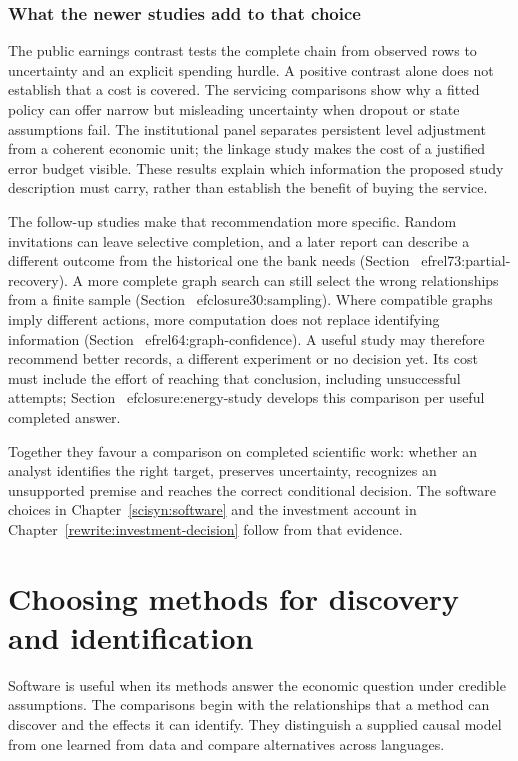 \section{What the newer studies add to that choice}
The public earnings contrast tests the complete chain from observed rows to
uncertainty and an explicit spending hurdle. A positive contrast alone does
not establish that a cost is covered. The servicing comparisons show why a
fitted policy can offer narrow but misleading uncertainty when dropout or
state assumptions fail. The institutional panel separates persistent level
adjustment from a coherent economic unit; the linkage study makes the cost
of a justified error budget visible. These results explain which information
the proposed study description must carry, rather than establish the benefit
of buying the service.

The follow-up studies make that recommendation more specific. Random
invitations can leave selective completion, and a later report can describe
a different outcome from the historical one the bank needs
(Section~
ef{rel73:partial-recovery}). A more complete graph search can
still select the wrong relationships from a finite sample
(Section~
ef{closure30:sampling}). Where compatible graphs imply different
actions, more computation does not replace identifying information
(Section~
ef{rel64:graph-confidence}). A useful study may therefore
recommend better records, a different experiment or no decision yet.
Its cost must include the effort of reaching that conclusion, including
unsuccessful attempts; Section~
ef{closure:energy-study} develops this
comparison per useful completed answer.

Together they favour a comparison on completed scientific work: whether an
analyst identifies the right target, preserves uncertainty, recognizes an
unsupported premise and reaches the correct conditional decision. The
software choices in Chapter~\ref{scisyn:software} and the investment account
in Chapter~\ref{rewrite:investment-decision} follow from that evidence.



\part{Choosing methods for discovery and identification}
\label{reading:part-methods}
Software is useful when its methods answer the economic question under
credible assumptions. The comparisons begin with the relationships that a
method can discover and the effects it can identify. They distinguish a supplied
causal model from one learned from data and compare alternatives across languages.



